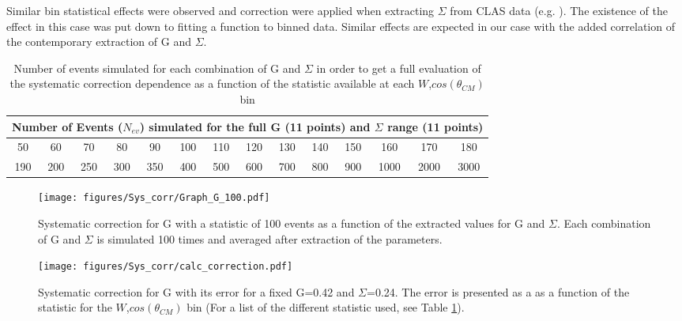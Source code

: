 Similar bin statistical effects were observed and correction were applied when extracting $\Sigma$ from CLAS data (e.g. \cite{Zacha_2017}). The existence of the effect in this case was put down to fitting a function to binned data. Similar effects are expected in our case with the added correlation of the contemporary extraction of G and $\Sigma$.
\begin{table}
  \begin{center}
    \begin{tabular}{ ||c|c|c|c|c|c|c|c|c|c|c|c|c|c||}
      \hline
      \multicolumn{14}{|c|}{Number of Events ($N_{ev}$) simulated for the full G (11 points) and $\Sigma$ range (11 points)  } \\
      \hline
      \hline
      50&60&70&80&90&100&110&120&130&140&150&160&170&180\\
      \hline
      190&200&250&300&350&400&500&600&700&800&900&1000&2000&3000 \\
      \hline
    \end{tabular}
  \end{center}
  \caption{Number of events simulated for each combination of G and $\Sigma$ in order to get a full evaluation of the systematic correction dependence as a function of the statistic available at each $W$,$cos(\theta_{CM})$ bin}
  \label{table:sim_nevents}
\end{table}


\begin{figure}[H]
  \begin{center}
    \texttt{[image: figures/Sys\_corr/Graph\_G\_100.pdf]} \\
    \caption{Systematic correction for G with a statistic of 100 events as a function of the extracted values for G and $\Sigma$. Each combination of G and $\Sigma$ is simulated 100 times and averaged after extraction of the parameters. }
    \label{fig:sys_correction_100}
  \end{center}
\end{figure}
\begin{figure}[H]
  \begin{center}
    \texttt{[image: figures/Sys\_corr/calc\_correction.pdf]} \\
    \caption{Systematic correction for G with its error for a fixed G=0.42 and $\Sigma$=0.24. The error is presented as a  as a function of the statistic for the $W$,$cos(\theta_{CM})$ bin (For a list of the different statistic used, see Table \ref{table:sim_nevents}).  }
    \label{fig:calc_sys_correction}
  \end{center}
\end{figure}

